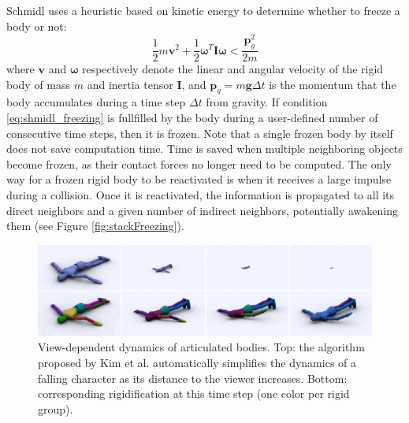 Schmidl \cite{Schmidl2002} uses a heuristic based on kinetic energy to determine whether to freeze a body or not:
\begin{equation}
\label{eq:shmidl_freezing}
\frac{1}{2}m\mathbf{v}^{2} + \frac{1}{2}\mathbf{\omega}^{T}\mathbf{I}\mathbf{\omega} < \frac{\mathbf{p}_{g}^{2}}{2m}
\end{equation}
where $\mathbf{v}$ and $\mathbf{\omega}$ respectively denote the linear and angular velocity of the rigid body of mass $m$ and inertia tensor $\mathbf{I}$, and $\mathbf{p}_{g}=m\mathbf{g}\Delta t$ is the momentum that the body accumulates during a time step $\Delta t$ from gravity.
If condition \eqref{eq:shmidl_freezing} is fullfilled by the body during a user-defined number of consecutive time steps, then it is frozen.
Note that a single frozen body by itself does not save computation time.
Time is saved when multiple neighboring objects become frozen, as their contact forces no longer need to be computed.
The only way for a frozen rigid body to be reactivated is when it receives a large impulse during a collision.
Once it is reactivated, the information is propagated to all its direct neighbors and a given number of indirect neighbors, potentially awakening them (see Figure \ref{fig:stackFreezing}).

\begin{figure}[t]
\includegraphics[width=\linewidth]{./images/starAdaptivity-cgf2016/WMComparisonNoLabels.png}
\caption{ View-dependent dynamics of articulated bodies. Top: the algorithm proposed by Kim et al. \cite{Kim2008Collision} automatically simplifies the dynamics of a falling character as
its distance to the viewer increases. Bottom: corresponding rigidification at this time step (one color per rigid group). \label{fig:ViewDependentArticulatedBodies}}
\end{figure}

